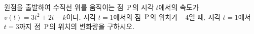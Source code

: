 원점을 출발하여 수직선 위를 움직이는 점~$\mathrm{P}$의 시각 $t$에서의 속도가 $v(t)=3t^2+2t-k$이다. 시각 $t=1$에서의 점~$\mathrm{P}$의 위치가 $-4$일 때, 시각 $t=1$에서 $t=3$까지 점~$\mathrm{P}$의 위치의 변화량을 구하시오. 
